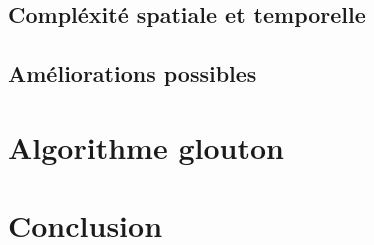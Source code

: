 \documentclass[a4paper,10pt]{article}
\begin{document}
\subsection{Compléxité spatiale et temporelle}	

\subsection{Améliorations possibles}

\section{Algorithme glouton}

\section{Conclusion}
\end{document}
